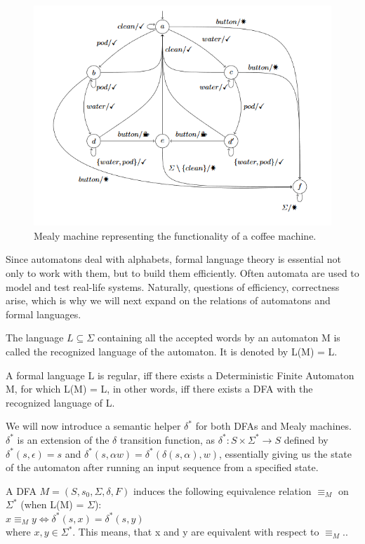 \begin{figure}[H]
	\centering
	\includegraphics[width=0.7\linewidth]{content/coffeemealy}
	\caption{Mealy machine representing the functionality of a coffee machine.\cite{Steffen2011}}
	\label{fig:coffeemealy}
\end{figure}

Since automatons deal with alphabets, formal language theory is essential not only to work with them, but to build them efficiently. Often automata are used to model and test real-life systems. Naturally, questions of efficiency, correctness arise, which is why we will next expand on the relations of automatons and formal languages.

\begin{definition}
	The language $L\subseteq\Sigma$ containing all the accepted words by an automaton M is called the recognized language of the automaton. It is denoted by L(M) = L.
\end{definition}

\begin{definition}
	A formal language L is regular, iff there exists a Deterministic Finite Automaton M, for which L(M) = L, in other words, iff there exists a DFA with the recognized language of L.
\end{definition}

We will now introduce a semantic helper $\delta^*$ for both DFAs and Mealy machines. $\delta^*$ is an extension of the $\delta$ transition function, as $\delta^*: S\times\Sigma^* \to S$ defined by $\delta^*(s,\epsilon) = s$ and $\delta^*(s, \alpha w) = \delta^*(\delta(s, \alpha), w)$, essentially giving us the state of the automaton after running an input sequence from a specified state.

\begin{definition} 
	A DFA $M=(S,s_{0},\Sigma,\delta,F)$ induces the following equivalence relation $\equiv_M$ on $\Sigma^*$ (when L(M) = $\Sigma$):\\
	\null\qquad$x\equiv_M y \iff \delta^*(s, x) = \delta^*(s, y)$\\
	where $x, y\in\Sigma^*$. This means, that x and y are equivalent with respect to $\equiv_M$.\cite{Kozen1977}.
\end{definition}

